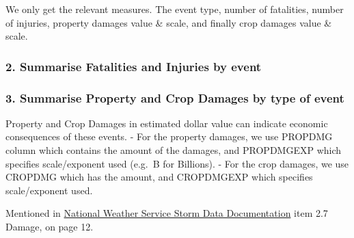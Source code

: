 \documentclass[]{article}
\newenvironment{Shaded}{\begin{snugshade}}{\end{snugshade}}
\newcommand{\KeywordTok}[1]{\textcolor[rgb]{0.13,0.29,0.53}{\textbf{#1}}}
\newcommand{\DataTypeTok}[1]{\textcolor[rgb]{0.13,0.29,0.53}{#1}}
\newcommand{\DecValTok}[1]{\textcolor[rgb]{0.00,0.00,0.81}{#1}}
\newcommand{\StringTok}[1]{\textcolor[rgb]{0.31,0.60,0.02}{#1}}
\newcommand{\OperatorTok}[1]{\textcolor[rgb]{0.81,0.36,0.00}{\textbf{#1}}}
\newcommand{\NormalTok}[1]{#1}
\begin{document}
We only get the relevant measures. The event type, number of fatalities,
number of injuries, property damages value \& scale, and finally crop
damages value \& scale.

\subsubsection{2. Summarise Fatalities and Injuries by
event}\label{summarise-fatalities-and-injuries-by-event}

\begin{Shaded}
\end{Shaded}

\subsubsection{3. Summarise Property and Crop Damages by type of
event}\label{summarise-property-and-crop-damages-by-type-of-event}

Property and Crop Damages in estimated dollar value can indicate
economic consequences of these events. - For the property damages, we
use PROPDMG column which contains the amount of the damages, and
PROPDMGEXP which specifies scale/exponent used (e.g.~B for Billions). -
For the crop damages, we use CROPDMG which has the amount, and
CROPDMGEXP which specifies scale/exponent used.

Mentioned in
\href{https://d396qusza40orc.cloudfront.net/repdata\%2Fpeer2_doc\%2Fpd01016005curr.pdf}{National
Weather Service Storm Data Documentation} item 2.7 Damage, on page 12.
\end{document}
